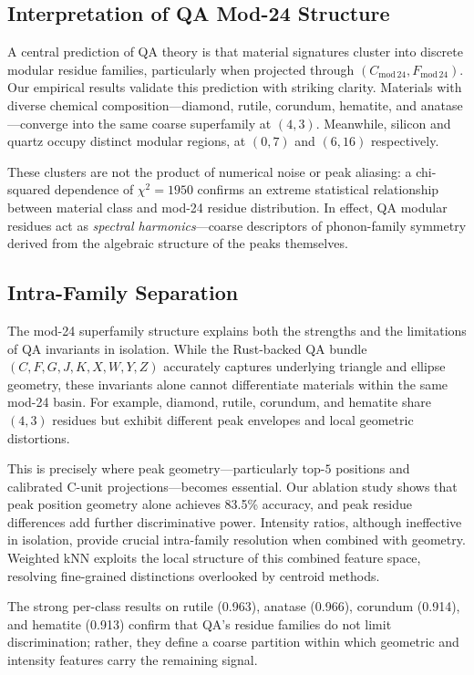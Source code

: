\documentclass[12pt]{article}
\begin{document}
\subsection{Interpretation of QA Mod-24 Structure}

A central prediction of QA theory is that material signatures cluster into discrete modular residue families,
particularly when projected through $(C_{\mathrm{mod}\,24},F_{\mathrm{mod}\,24})$.  
Our empirical results validate this prediction with striking clarity. Materials with diverse chemical 
composition—diamond, rutile, corundum, hematite, and anatase—converge into the same coarse
superfamily at $(4,3)$. Meanwhile, silicon and quartz occupy distinct modular regions, at $(0,7)$ and 
$(6,16)$ respectively.  

These clusters are not the product of numerical noise or peak aliasing: a chi-squared dependence of
$\chi^2 = 1950$ confirms an extreme statistical relationship between material class and mod-24 residue
distribution. In effect, QA modular residues act as \emph{spectral harmonics}—coarse descriptors of 
phonon-family symmetry derived from the algebraic structure of the peaks themselves.

\subsection{Intra-Family Separation}

The mod-24 superfamily structure explains both the strengths and the limitations of QA invariants in 
isolation. While the Rust-backed QA bundle $(C, F, G, J, K, X, W, Y, Z)$ accurately captures underlying 
triangle and ellipse geometry, these invariants alone cannot differentiate materials within the same 
mod-24 basin. For example, diamond, rutile, corundum, and hematite share $(4,3)$ residues but exhibit 
different peak envelopes and local geometric distortions.

This is precisely where peak geometry—particularly top-$5$ positions and calibrated C-unit projections—becomes essential.  
Our ablation study shows that peak position geometry alone achieves 83.5\% accuracy, and peak residue
differences add further discriminative power. Intensity ratios, although ineffective in isolation, provide 
crucial intra-family resolution when combined with geometry. Weighted kNN exploits the local structure of 
this combined feature space, resolving fine-grained distinctions overlooked by centroid methods.

The strong per-class results on rutile (0.963), anatase (0.966), corundum (0.914), and hematite (0.913) 
confirm that QA’s residue families do not limit discrimination; rather, they define a coarse partition 
within which geometric and intensity features carry the remaining signal.
\end{document}
